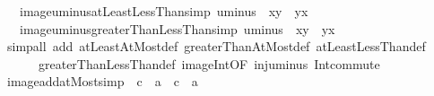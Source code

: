\begin{isabellebody}
\ \ \ image{\isacharunderscore}{\kern0pt}uminus{\isacharunderscore}{\kern0pt}atLeastLessThan{\isacharbrackleft}{\kern0pt}simp{\isacharbrackright}{\kern0pt}{\isacharcolon}{\kern0pt}\ {\isachardoublequoteopen}uminus\ {\isacharbackquote}{\kern0pt}\ {\isacharbraceleft}{\kern0pt}x{\isachardot}{\kern0pt}{\isachardot}{\kern0pt}{\isacharless}{\kern0pt}y{\isacharbraceright}{\kern0pt}\ {\isacharequal}{\kern0pt}\ {\isacharbraceleft}{\kern0pt}{\isacharminus}{\kern0pt}y{\isacharless}{\kern0pt}{\isachardot}{\kern0pt}{\isachardot}{\kern0pt}{\isacharminus}{\kern0pt}x{\isacharbraceright}{\kern0pt}{\isachardoublequoteclose}\isanewline
\ \ \ image{\isacharunderscore}{\kern0pt}uminus{\isacharunderscore}{\kern0pt}greaterThanLessThan{\isacharbrackleft}{\kern0pt}simp{\isacharbrackright}{\kern0pt}{\isacharcolon}{\kern0pt}\ {\isachardoublequoteopen}uminus\ {\isacharbackquote}{\kern0pt}\ {\isacharbraceleft}{\kern0pt}x{\isacharless}{\kern0pt}{\isachardot}{\kern0pt}{\isachardot}{\kern0pt}{\isacharless}{\kern0pt}y{\isacharbraceright}{\kern0pt}\ {\isacharequal}{\kern0pt}\ {\isacharbraceleft}{\kern0pt}{\isacharminus}{\kern0pt}y{\isacharless}{\kern0pt}{\isachardot}{\kern0pt}{\isachardot}{\kern0pt}{\isacharless}{\kern0pt}{\isacharminus}{\kern0pt}x{\isacharbraceright}{\kern0pt}{\isachardoublequoteclose}\isanewline
%
\isadelimproof
\ \ %
\endisadelimproof
%
\isatagproof
{}\isamarkupfalse%
\ {\isacharparenleft}{\kern0pt}simp{\isacharunderscore}{\kern0pt}all\ add{\isacharcolon}{\kern0pt}\ atLeastAtMost{\isacharunderscore}{\kern0pt}def\ greaterThanAtMost{\isacharunderscore}{\kern0pt}def\ atLeastLessThan{\isacharunderscore}{\kern0pt}def\isanewline
\ \ \ \ \ \ greaterThanLessThan{\isacharunderscore}{\kern0pt}def\ image{\isacharunderscore}{\kern0pt}Int{\isacharbrackleft}{\kern0pt}OF\ inj{\isacharunderscore}{\kern0pt}uminus{\isacharbrackright}{\kern0pt}\ Int{\isacharunderscore}{\kern0pt}commute{\isacharparenright}{\kern0pt}%
\endisatagproof
{\isafoldproof}%
%
\isadelimproof
\isanewline
%
\endisadelimproof
\isanewline
{}\isamarkupfalse%
\ image{\isacharunderscore}{\kern0pt}add{\isacharunderscore}{\kern0pt}atMost{\isacharbrackleft}{\kern0pt}simp{\isacharbrackright}{\kern0pt}{\isacharcolon}{\kern0pt}\ {\isachardoublequoteopen}{\isacharparenleft}{\kern0pt}{\isacharplus}{\kern0pt}{\isacharparenright}{\kern0pt}\ c\ {\isacharbackquote}{\kern0pt}\ {\isacharbraceleft}{\kern0pt}{\isachardot}{\kern0pt}{\isachardot}{\kern0pt}a{\isacharbraceright}{\kern0pt}\ {\isacharequal}{\kern0pt}\ {\isacharbraceleft}{\kern0pt}{\isachardot}{\kern0pt}{\isachardot}{\kern0pt}c\ {\isacharplus}{\kern0pt}\ a{\isacharbraceright}{\kern0pt}{\isachardoublequoteclose}\isanewline

\end{isabellebody}
